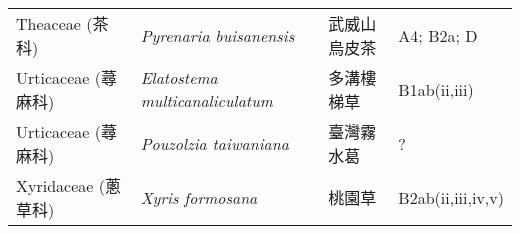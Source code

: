 \begin{longtable}{p{3cm}p{5cm}p{3cm}p{4cm}}
    Theaceae (茶科) & \textit{Pyrenaria buisanensis}  & 武威山烏皮茶 & A4; B2a; D \index{Pyrenaria@\textit{Pyrenaria}!buisanensis@\textit{buisanensis}}  \index{武威山烏皮茶} \\
    Urticaceae (蕁麻科) & \textit{Elatostema multicanaliculatum}  & 多溝樓梯草 & B1ab(ii,iii) \index{Elatostema@\textit{Elatostema}!multicanaliculatum@\textit{multicanaliculatum}}  \index{多溝樓梯草} \\
    Urticaceae (蕁麻科) & \textit{Pouzolzia taiwaniana}  & 臺灣霧水葛 & ? \index{Pouzolzia@\textit{Pouzolzia}!taiwaniana@\textit{taiwaniana}}  \index{臺灣霧水葛} \\
    Xyridaceae (蔥草科) & \textit{Xyris formosana}  & 桃園草 & B2ab(ii,iii,iv,v) \index{Xyris@\textit{Xyris}!formosana@\textit{formosana}}  \index{桃園草} \\
    \bottomrule
        \end{longtable}
